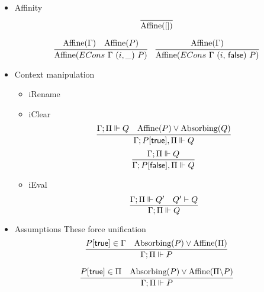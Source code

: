 \begin{itemize}
\item Affinity
  \[
  \infer{\Affine{[]}}{}
  \]

  \begin{equation*}
  \infer{\Affine{ECons\ \Gamma\ (i,\_)\ P}}
        {\Affine{\Gamma} &
         \Affine{P}
       }
  \quad
  \infer{\Affine{ECons\ \Gamma\ (i,\, \false)\ P}}
        {\Affine{\Gamma}}
  \end{equation*}
\item Context manipulation
  \begin{itemize}
  \item iRename
  \item iClear
    \[
    \infer{\entails {\IntuD} {P[\true], \SpatD} {Q}}
          {\entailsD Q &
           \Affine{P} \vee \Absorbing{Q}}
    \]
    \[
    \infer{\entails {\IntuD} {P[\false], \SpatD} {Q}}
          {\entailsD Q}
    \]
  \item iEval
    \[
    \infer{\entailsD Q}
          {\entailsD Q' &
           Q' \vdash Q
          }
    \]
  \end{itemize}
\item Assumptions
  These force unification
  \[
  \infer{\entailsD P}
        {P[\true] \in \IntuD &
         \Absorbing{P} \vee \Affine{\SpatD}}
  \]

 \[
  \infer{\entailsD P}
        {P[\true] \in \SpatD &
         \Absorbing{P} \vee \Affine{\SpatD \backslash P}}
 \]


\end{itemize}
